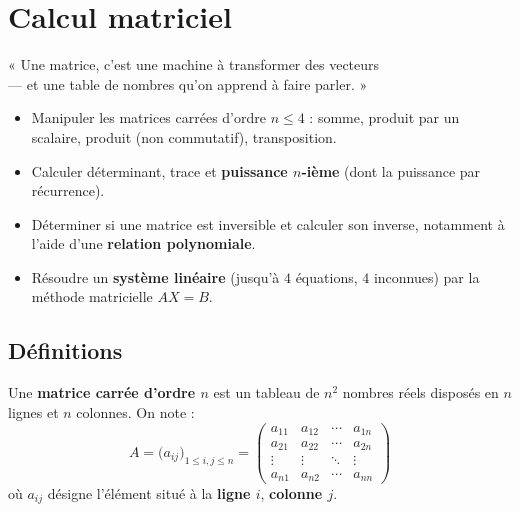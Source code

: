 \chapter{Calcul matriciel}

\begin{citationchapitre}
	« Une matrice, c'est une machine à transformer des vecteurs\\
	— et une table de nombres qu'on apprend à faire parler. »
\end{citationchapitre}

\begin{objectifs}
	\begin{itemize}[label=\textbullet]
		\item Manipuler les matrices carrées d'ordre $n \leqslant 4$ : somme,
		produit par un scalaire, produit (non commutatif), transposition.
		\item Calculer déterminant, trace et \textbf{puissance $n$-ième}
		(dont la puissance par récurrence).
		\item Déterminer si une matrice est inversible et calculer son inverse,
		notamment à l'aide d'une \textbf{relation polynomiale}.
		\item Résoudre un \textbf{système linéaire} (jusqu'à $4$ équations,
		$4$ inconnues) par la méthode matricielle $AX = B$.
	\end{itemize}
\end{objectifs}


\section{Définitions}

\begin{definition}
	Une \textbf{matrice carrée d'ordre $n$} est un tableau de $n^2$ nombres
	réels disposés en $n$ lignes et $n$ colonnes. On note :
	\[
	A = \bigl(a_{ij}\bigr)_{1\le i,j \le n}
	=
	\begin{pmatrix}
		a_{11} & a_{12} & \cdots & a_{1n} \\
		a_{21} & a_{22} & \cdots & a_{2n} \\
		\vdots & \vdots & \ddots & \vdots \\
		a_{n1} & a_{n2} & \cdots & a_{nn}
	\end{pmatrix}
	\]
	où $a_{ij}$ désigne l'élément situé à la \textbf{ligne $i$}, \textbf{colonne $j$}.
\end{definition}

